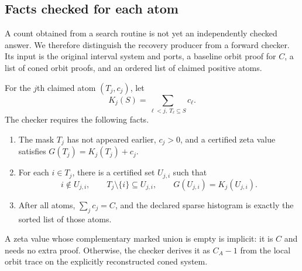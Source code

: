 \documentclass[11pt,letterpaper]{article}
\theoremstyle{definition}
\begin{document}
\subsection{Facts checked for each atom}
A count obtained from a search routine is not yet an independently checked
answer. We therefore distinguish the recovery producer from a forward
checker. Its input is the original interval system and ports, a baseline
orbit proof for $C$, a list of coned orbit proofs, and an ordered list of
claimed positive atoms.

For the $j$th claimed atom $(T_j,c_j)$, let
\[
 K_j(S)=\sum_{\ell<j,\ T_\ell\subseteq S}c_\ell.
\]
The checker requires the following facts.
\begin{enumerate}[leftmargin=*,itemsep=0.2em]
\item The mask $T_j$ has not appeared earlier, $c_j>0$, and a certified
zeta value satisfies $G(T_j)=K_j(T_j)+c_j$.
\item For each $i\in T_j$, there is a certified set $U_{j,i}$ such that
\begin{equation}\label{eq:zero-witness}
 i\notin U_{j,i},\qquad T_j\setminus\{i\}\subseteq U_{j,i},\qquad
 G(U_{j,i})=K_j(U_{j,i}).
\end{equation}
\item After all atoms, $\sum_jc_j=C$, and the declared sparse histogram is
exactly the sorted list of those atoms.
\end{enumerate}
A zeta value whose complementary marked union is empty is implicit: it is
$C$ and needs no extra proof. Otherwise, the checker derives it as $C_A-1$
from the local orbit trace on the explicitly reconstructed coned system.
\end{document}
